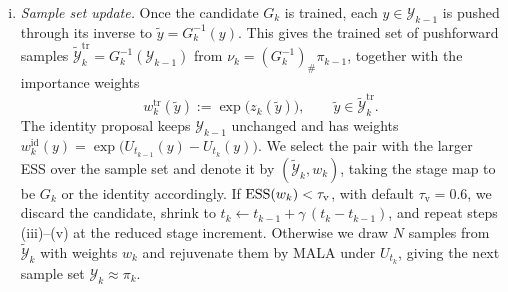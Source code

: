 \documentclass{article}
\begin{document}
\begin{enumerate}[(i)]
\item \emph{Sample set update.} Once the candidate $G_k$ is trained, each $y \in \mathcal Y_{k-1}$ is pushed through its inverse to $\tilde y = G_k^{-1}(y)$. This gives the trained set of pushforward samples $\tilde{\mathcal Y}_k^{\mathrm{tr}} = G_k^{-1}(\mathcal Y_{k-1})$ from $\nu_k = (G_k^{-1})_{\#}\pi_{k-1}$, together with the importance weights
\begin{equation*}
    w_k^{\mathrm{tr}}(\tilde y) := \exp\bigl(z_k(\tilde y)\bigr),
    \qquad \tilde y \in \tilde{\mathcal Y}_k^{\mathrm{tr}} .
\end{equation*}
The identity proposal keeps $\mathcal Y_{k-1}$ unchanged and has weights $w_k^{\mathrm{id}}(y)=\exp\big(U_{t_{k-1}}(y)-U_{t_k}(y)\big)$. We select the pair with the larger ESS over the sample set and denote it by $(\tilde{\mathcal Y}_k,w_k)$, taking the stage map to be $G_k$ or the identity accordingly. If $\mathrm{ESS}(w_k) < \tau_{\mathrm v}$, with default $\tau_{\mathrm v} = 0.6$, we discard the candidate, shrink to $t_k \gets t_{k-1} + \gamma\,(t_k - t_{k-1})$, and repeat steps (iii)--(v) at the reduced stage increment. Otherwise we draw $N$ samples from $\tilde{\mathcal Y}_k$ with weights $w_k$ and rejuvenate them by MALA under $U_{t_k}$, giving the next sample set $\mathcal Y_k\approx\pi_k$.
\end{enumerate}
\end{document}
